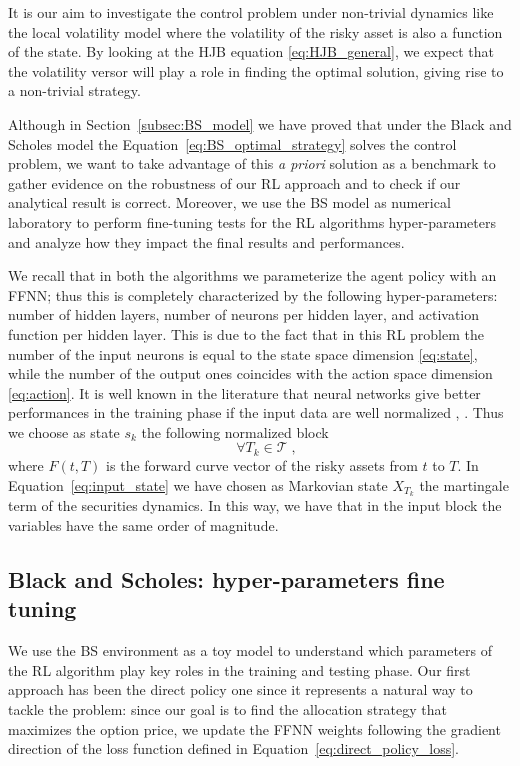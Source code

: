 \documentclass[runningheads]{m2ef}
\begin{document}
	It is our aim to investigate the control problem under non-trivial dynamics like the local volatility model where the volatility of the risky asset is also a function of the state. By looking at the HJB equation \eqref{eq:HJB_general}, we expect that the volatility versor will play a role in finding the optimal solution, giving rise to a non-trivial strategy.

	Although in Section~\ref{subsec:BS_model} we have proved that under the Black and Scholes model the Equation~\eqref{eq:BS_optimal_strategy} solves the control problem, we want to take advantage of this \textit{a priori} solution as a benchmark to gather evidence on the robustness of our RL approach and to check if our analytical result is correct. Moreover, we use the BS model as numerical laboratory to perform fine-tuning tests for the RL algorithms hyper-parameters and analyze how they impact the final results and performances.

	We recall that in both the algorithms we parameterize the agent policy with an FFNN; thus this is completely characterized by the following hyper-parameters: number of hidden layers, number of neurons per hidden layer, and activation function per hidden layer. This is due to the fact that in this RL problem the number of the input neurons is equal to the state space dimension \eqref{eq:state}, while the number of the output ones coincides with the action space dimension \eqref{eq:action}. It is well known in the literature that neural networks give better performances in the training phase if the input data are well normalized \cite{Puheim2014}, \cite{Sola1997}. Thus we choose as state $s_k$ the following normalized block  
	\begin{equation}
		[\log(S_{T_k}/F(0,T_k)), I_{T_k}/I_0, T_k ] \quad \forall T_k\in\mathcal{T} \; ,
	\label{eq:input_state}\end{equation}
	where $F(t,T)$ is the forward curve vector of the risky assets from $t$ to $T$. In Equation~\eqref{eq:input_state} we have chosen as Markovian state $X_{T_k}$ the martingale term of the securities dynamics. In this way, we have that in the input block the variables have the same order of magnitude.


	\subsection{Black and Scholes: hyper-parameters fine tuning}
	We use the BS environment as a toy model to understand which parameters of the RL algorithm play key roles in the training and testing phase. 
	Our first approach has been the direct policy one since it represents a natural way to tackle the problem: since our goal is to find the allocation 
	strategy that maximizes the option price, we update the FFNN weights following the gradient direction of the loss function defined in Equation~\eqref{eq:direct_policy_loss}. 
\end{document}
